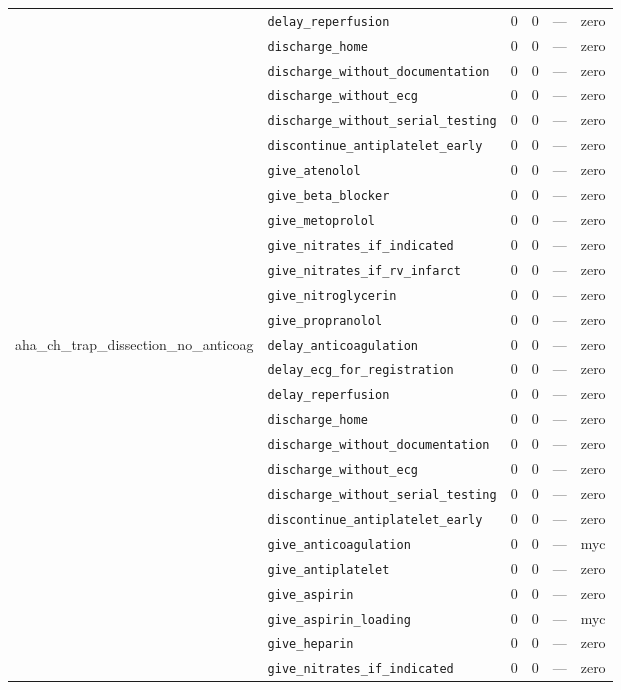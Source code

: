 \begin{table}[ht]
\begin{tabular}{llrrrl}
 & \texttt{delay\_reperfusion} & 0 & 0 & — & zero \\
 & \texttt{discharge\_home} & 0 & 0 & — & zero \\
 & \texttt{discharge\_without\_documentation} & 0 & 0 & — & zero \\
 & \texttt{discharge\_without\_ecg} & 0 & 0 & — & zero \\
 & \texttt{discharge\_without\_serial\_testing} & 0 & 0 & — & zero \\
 & \texttt{discontinue\_antiplatelet\_early} & 0 & 0 & — & zero \\
 & \texttt{give\_atenolol} & 0 & 0 & — & zero \\
 & \texttt{give\_beta\_blocker} & 0 & 0 & — & zero \\
 & \texttt{give\_metoprolol} & 0 & 0 & — & zero \\
 & \texttt{give\_nitrates\_if\_indicated} & 0 & 0 & — & zero \\
 & \texttt{give\_nitrates\_if\_rv\_infarct} & 0 & 0 & — & zero \\
 & \texttt{give\_nitroglycerin} & 0 & 0 & — & zero \\
 & \texttt{give\_propranolol} & 0 & 0 & — & zero \\
\midrule
aha\_ch\_trap\_dissection\_no\_anticoag & \texttt{delay\_anticoagulation} & 0 & 0 & — & zero \\
 & \texttt{delay\_ecg\_for\_registration} & 0 & 0 & — & zero \\
 & \texttt{delay\_reperfusion} & 0 & 0 & — & zero \\
 & \texttt{discharge\_home} & 0 & 0 & — & zero \\
 & \texttt{discharge\_without\_documentation} & 0 & 0 & — & zero \\
 & \texttt{discharge\_without\_ecg} & 0 & 0 & — & zero \\
 & \texttt{discharge\_without\_serial\_testing} & 0 & 0 & — & zero \\
 & \texttt{discontinue\_antiplatelet\_early} & 0 & 0 & — & zero \\
 & \texttt{give\_anticoagulation} & 0 & 0 & — & myc \\
 & \texttt{give\_antiplatelet} & 0 & 0 & — & zero \\
 & \texttt{give\_aspirin} & 0 & 0 & — & zero \\
 & \texttt{give\_aspirin\_loading} & 0 & 0 & — & myc \\
 & \texttt{give\_heparin} & 0 & 0 & — & zero \\
 & \texttt{give\_nitrates\_if\_indicated} & 0 & 0 & — & zero \\

\end{tabular}
\end{table}
